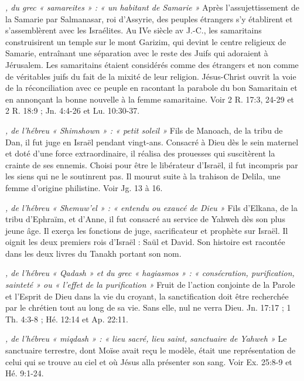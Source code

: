\begin{multicols}{2}
{\textit{, du grec « samareites » : « un habitant de Samarie »}\newline
Après l'assujettissement de la Samarie par Salmanasar, roi d'Assyrie, des peuples étrangers s'y établirent et s'assemblèrent avec les Israélites. Au IVe siècle av J.-C., les samaritains construisirent un temple sur le mont Garizim, qui devint le centre religieux de Samarie, entraînant une séparation avec le reste des Juifs qui adoraient à Jérusalem. Les samaritains étaient considérés comme des étrangers et non comme de véritables juifs du fait de la mixité de leur religion. Jésus-Christ ouvrit la voie de la réconciliation avec ce peuple en racontant la parabole du bon Samaritain et en annonçant la bonne nouvelle à la femme samaritaine. Voir 2 R. 17:3, 24-29 et 2 R. 18:9 ; Jn. 4:4-26 et Lu. 10:30-37.

\textit{, de l'hébreu « Shimshown » : « petit soleil »}\newline
Fils de Manoach, de la tribu de Dan, il fut juge en Israël pendant vingt-ans. Consacré à Dieu dès le sein maternel et doté d'une force extraordinaire, il réalisa des prouesses qui suscitèrent la crainte de ses ennemis. Choisi pour être le libérateur d'Israël, il fut incompris par les siens qui ne le soutinrent pas. Il mourut suite à la trahison de Delila, une femme d'origine philistine. Voir Jg. 13 à 16.

\textit{, de l'hébreu « Shemuw'el » : « entendu ou exaucé de Dieu »}\newline
Fils d'Elkana, de la tribu d'Ephraïm, et d'Anne, il fut consacré au service de Yahweh dès son plus jeune âge. Il exerça les fonctions de juge, sacrificateur et prophète sur Israël. Il oignit les deux premiers rois d'Israël : Saül et David. Son histoire est racontée dans les deux livres du Tanakh portant son nom.

\textit{, de l'hébreu « Qadash » et du grec « hagiasmos » : « consécration, purification, sainteté » ou « l'effet de la purification »}\newline
Fruit de l'action conjointe de la Parole et l'Esprit de Dieu dans la vie du croyant, la sanctification doit être recherchée par le chrétien tout au long de sa vie. Sans elle, nul ne verra Dieu. Jn. 17:17 ; 1 Th. 4:3-8 ; Hé. 12:14 et Ap. 22:11.

\textit{, de l'hébreu « miqdash » : « lieu sacré, lieu saint, sanctuaire de Yahweh »}\newline
Le sanctuaire terrestre, dont Moïse avait reçu le modèle, était une représentation de celui qui se trouve au ciel et où Jésus alla présenter son sang. Voir Ex. 25:8-9 et Hé. 9:1-24.

}
\end{multicols}
